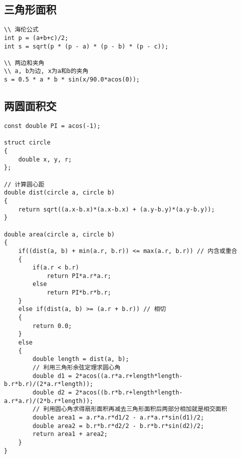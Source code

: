 \subsection{三角形面积}
\begin{lstlisting}
\\ 海伦公式
int p = (a+b+c)/2;
int s = sqrt(p * (p - a) * (p - b) * (p - c));

\\ 两边和夹角
\\ a, b为边, x为a和b的夹角
s = 0.5 * a * b * sin(x/90.0*acos(0));
\end{lstlisting}

\subsection{两圆面积交}
\begin{lstlisting}
const double PI = acos(-1);

struct circle
{
	double x, y, r;
};

// 计算圆心距
double dist(circle a, circle b)
{
	return sqrt((a.x-b.x)*(a.x-b.x) + (a.y-b.y)*(a.y-b.y));
}

double area(circle a, circle b)
{
	if((dist(a, b) + min(a.r, b.r)) <= max(a.r, b.r)) // 内含或重合
	{
		if(a.r < b.r)
			return PI*a.r*a.r;
		else
			return PI*b.r*b.r;
	}
	else if(dist(a, b) >= (a.r + b.r)) // 相切
	{
		return 0.0;
	}
	else
	{
		double length = dist(a, b);
		// 利用三角形余弦定理求圆心角
		double d1 = 2*acos((a.r*a.r+length*length-b.r*b.r)/(2*a.r*length));
		double d2 = 2*acos((b.r*b.r+length*length-a.r*a.r)/(2*b.r*length));
		// 利用圆心角求得扇形面积再减去三角形面积后两部分相加就是相交面积
		double area1 = a.r*a.r*d1/2 - a.r*a.r*sin(d1)/2;
		double area2 = b.r*b.r*d2/2 - b.r*b.r*sin(d2)/2;
		return area1 + area2;
	}
}
\end{lstlisting}

